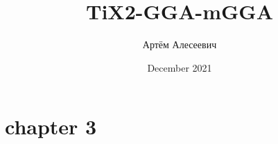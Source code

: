 \documentclass[a4paper,12pt]{report}
\title{TiX2-GGA-mGGA}
\author{Артём Алесеевич}
\date{December 2021}
\begin{document}
\maketitle
\tableofcontents


\section{chapter 3}


\end{document}
